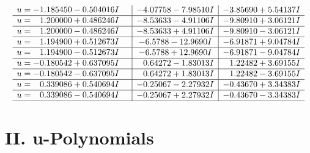 \documentclass[1p]{elsarticle_modified}
\theoremstyle{definition}
\begin{document}
$$\begin{array}{c|c|c}
\begin{aligned}
u &= -1.185450 - 0.504016 I\end{aligned}
 & -4.07758 - 7.98510 I & -3.85690 + 5.54137 I \\ \hline\begin{aligned}
u &= \phantom{-}1.200000 + 0.486246 I\end{aligned}
 & -8.53633 - 4.91106 I & -9.80910 + 3.06121 I \\ \hline\begin{aligned}
u &= \phantom{-}1.200000 - 0.486246 I\end{aligned}
 & -8.53633 + 4.91106 I & -9.80910 - 3.06121 I \\ \hline\begin{aligned}
u &= \phantom{-}1.194900 + 0.512673 I\end{aligned}
 & -6.5788 - 12.9690 I & -6.91871 + 9.04784 I \\ \hline\begin{aligned}
u &= \phantom{-}1.194900 - 0.512673 I\end{aligned}
 & -6.5788 + 12.9690 I & -6.91871 - 9.04784 I \\ \hline\begin{aligned}
u &= -0.180542 + 0.637095 I\end{aligned}
 & \phantom{-}0.64272 - 1.83013 I & \phantom{-}1.22482 + 3.69155 I \\ \hline\begin{aligned}
u &= -0.180542 - 0.637095 I\end{aligned}
 & \phantom{-}0.64272 + 1.83013 I & \phantom{-}1.22482 - 3.69155 I \\ \hline\begin{aligned}
u &= \phantom{-}0.339086 + 0.540694 I\end{aligned}
 & -0.25067 - 2.27932 I & -0.43670 + 3.34383 I \\ \hline\begin{aligned}
u &= \phantom{-}0.339086 - 0.540694 I\end{aligned}
 & -0.25067 + 2.27932 I & -0.43670 - 3.34383 I\\
 \hline 
 \end{array}$$\newpage
\newpage\renewcommand{\arraystretch}{1}
\centering \section*{ II. u-Polynomials}
\end{document}
